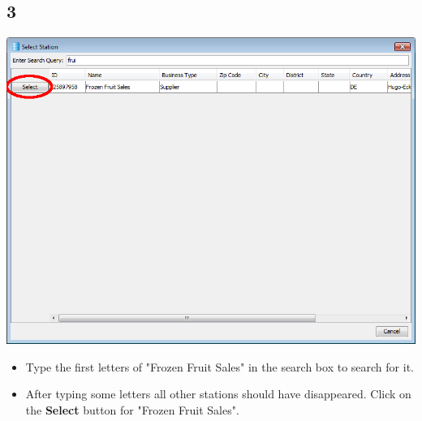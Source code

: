 \documentclass{beamer}
\begin{document}
\subsection{3}
\begin{frame}
	\begin{center}
  		\includegraphics[height=0.5\textheight]{3.png}
	\end{center}
	\begin{itemize}
		\item Type the first letters of "Frozen Fruit Sales" in the search box to search for it.
		\item After typing some letters all other stations should have disappeared. Click on the \textbf{Select} button for "Frozen Fruit Sales".
	\end{itemize}
\end{frame}
\end{document}
